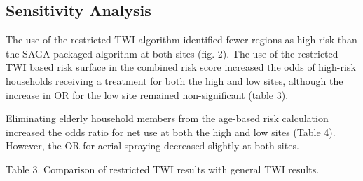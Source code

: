 \documentclass{article}\usepackage[]{graphicx}\usepackage[]{color}
\makeatletter
\newenvironment{kframe}{%
 \def\at@end@of@kframe{}%
 \ifinner\ifhmode%
  \def\at@end@of@kframe{\end{minipage}}%
  \begin{minipage}{\columnwidth}%
 \fi\fi%
 \def\FrameCommand##1{\hskip\@totalleftmargin \hskip-\fboxsep
 \colorbox{shadecolor}{##1}\hskip-\fboxsep
     \hskip-\linewidth \hskip-\@totalleftmargin \hskip\columnwidth}%
 \MakeFramed {\advance\hsize-\width
   \@totalleftmargin\z@ \linewidth\hsize
   \@setminipage}}%
 {\par\unskip\endMakeFramed%
 \at@end@of@kframe}
\newenvironment{knitrout}{}{} %
\makeatother
\begin{document}
\begin{knitrout}
\color{fgcolor}\begin{kframe}


{\ttfamily\noindent\bfseries\color{errorcolor}{\#\# Error in eval(expr, envir, enclos): object 'comrsks' not found}}

{\ttfamily\noindent\bfseries\color{errorcolor}{\#\# Error in eval(expr, envir, enclos): object 'comrsks' not found}}\end{kframe}
\end{knitrout}
\begin{knitrout}
\color{fgcolor}\begin{kframe}


{\ttfamily\noindent\bfseries\color{errorcolor}{\#\# Error in eval(expr, envir, enclos): object 'comrsks' not found}}

{\ttfamily\noindent\bfseries\color{errorcolor}{\#\# Error in eval(expr, envir, enclos): object 'comrsks' not found}}

{\ttfamily\noindent\bfseries\color{errorcolor}{\#\# Error in eval(expr, envir, enclos): object 'comrsks' not found}}

{\ttfamily\noindent\bfseries\color{errorcolor}{\#\# Error in eval(expr, envir, enclos): object 'comrsks' not found}}\end{kframe}
\end{knitrout}

\subsection{Sensitivity Analysis}

The use of the restricted TWI algorithm identified fewer regions as high risk than the SAGA packaged algorithm at both sites (fig. 2).  The use of the restricted TWI based risk surface in the combined risk score increased the odds of high-risk households receiving a treatment for both the high and low sites,  although the increase in OR for the low site remained non-significant (table 3).

Eliminating elderly household members from the age-based risk calculation increased the odds ratio for net use at both the high and low sites (Table 4).  However,  the OR for aerial spraying decreased slightly at both sites.  

Table 3. Comparison of restricted TWI results with general TWI results.
\end{document}
